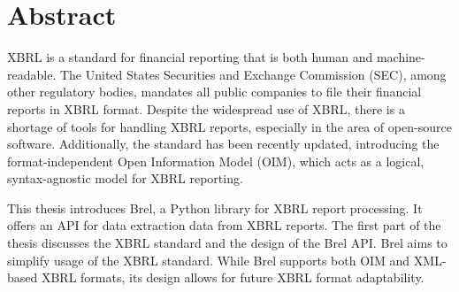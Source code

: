 \section{Abstract}




XBRL is a standard for financial reporting that is both human and machine-readable\cite{xbrl}.
The United States Securities and Exchange Commission (SEC)\cite{sec_ixbrl}, among other regulatory bodies,  
mandates all public companies to file their financial reports in XBRL format.
Despite the widespread use of XBRL, there is a shortage of tools for handling XBRL reports,
especially in the area of open-source software.
Additionally, the standard has been recently updated,  
introducing the format-independent Open Information Model (OIM)\cite{oim}, 
which acts as a logical, syntax-agnostic model for XBRL reporting.

This thesis introduces Brel, a Python library for XBRL report processing.  
It offers an API for data extraction data from XBRL reports.
The first part of the thesis discusses the XBRL standard and the design of the Brel API.
Brel aims to simplify usage of the XBRL standard.
While Brel supports both OIM and XML-based XBRL formats,  
its design allows for future XBRL format adaptability.

